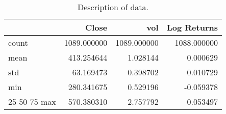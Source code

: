 \begin{table}
\caption{Description of data.}
\label{tab:data_desc}
\begin{tabular}{lrrr}
\toprule
 & Close & vol & Log Returns \\
\midrule
count & 1089.000000 & 1089.000000 & 1088.000000 \\
mean & 413.254644 & 1.028144 & 0.000629 \\
std & 63.169473 & 0.398702 & 0.010729 \\
min & 280.341675 & 0.529196 & -0.059378 \\
25%
50%
75%
max & 570.380310 & 2.757792 & 0.053497 \\
\bottomrule
\end{tabular}
\end{table}
